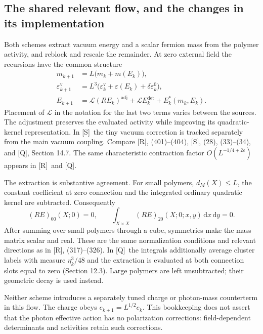 \documentclass[11pt]{article}
\numberwithin{equation}{section}
\newcommand{\dd}{\mathrm d}
\newcommand{\Q}{\textup{[Q]}}
\newcommand{\UR}{\textup{[R]}}
\newcommand{\US}{\textup{[S]}}
\begin{document}
\subsection{The shared relevant flow, and the changes in its implementation}

Both schemes extract vacuum energy and a scalar fermion mass from
the polymer activity, and reblock and rescale the remainder. At zero
external field the recursions have the common structure
\begin{align}
 m_{k+1}&=L\bigl(m_k+m(E_k)\bigr),\\
 \varepsilon^{\mathrm v}_{k+1}
   &=L^3\bigl(\varepsilon^{\mathrm v}_k+
                  \varepsilon(E_k)+\delta\varepsilon_k^0\bigr),\\
 E_{k+1}&=\mathcal L(RE_k)^{\mathrm{adj}}
                   +\mathcal L E_k^{\mathrm{det}}+E_k^*(m_k,E_k).
 \label{eq:digest-flow}
\end{align}
Placement of $\mathcal L$ in the notation for the last two terms
varies between the sources. The adjustment preserves the evaluated
activity while improving its quadratic-kernel representation.
In \US\ the tiny vacuum correction is tracked separately from
the main vacuum coupling.
Compare \UR, (401)--(404), \US, (28), (33)--(34), and \Q, Section 14.7.
The same characteristic contraction factor
$O(L^{-1/4+2\varepsilon})$ appears in \UR\ and \Q.

The extraction is substantive agreement. For small polymers,
$d_M(X)\le L$, the constant coefficient at zero connection and the
integrated ordinary quadratic kernel are subtracted. Consequently
\begin{equation}
 (RE)_{00}(X;0)=0,\qquad
 \int_{X\times X}(RE)_{20}(X;0;x,y)\,\dd x\,\dd y=0.
\end{equation}
After summing over small polymers through a cube, symmetries make the
mass matrix scalar and real. These are the same normalization
conditions and relevant directions as in \UR, (317)--(326).
In \Q\ the integrals additionally average cluster labels with measure
$\eta_k^3/48$ and the extraction is evaluated at both connection slots
equal to zero (Section 12.3). Large polymers are left unsubtracted;
their geometric decay is used instead.

Neither scheme introduces a separately tuned charge or photon-mass
counterterm in this flow. The charge obeys
$e_{k+1}=L^{1/2}e_k$. This bookkeeping does not assert that the photon
effective action has no polarization corrections: field-dependent
determinants and activities retain such corrections.
\end{document}
